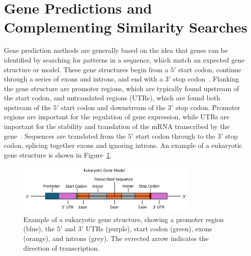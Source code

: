 \section{Gene Predictions and Complementing Similarity Searches}
\label{lit:similarity-searches}
Gene prediction methods are generally based on the idea that genes can be
identified by searching for patterns in a sequence, which match an expected gene structure or model. These gene structures begin from a $5'$ start codon, continue through a series of exons and introns, and end with a $3'$ stop codon~\cite{loftus2003a}. Flanking the gene structure are promoter regions, which are typically found upstream of the start codon, and untranslated regions (UTRs), which are found both upstream of the $5'$ start codon and downstream of the $3'$ stop codon. Promoter regions are important for the regulation of gene expression, while UTRs are important for the stability and translation of the mRNA transcribed by the gene~\cite{loftus2003a}. Sequences are translated from the $5'$ start codon through to the $3'$ stop codon, splicing together exons and ignoring introns. An example of a eukaryotic gene structure is shown in Figure~\ref{fig:gene-structure}.

\begin{figure}[ht]
    \centering
    \includegraphics[width=0.8\textwidth]{figures/gene-model-fig-msc.png}
    \caption{Example of a eukaryotic gene structure, showing a promoter region (blue), the $5'$ and $3'$ UTRs (purple), start codon (green), exons (orange), and introns (grey). The evrected arrow indicates the direction of transcription. }
    \label{fig:gene-structure}
\end{figure}

